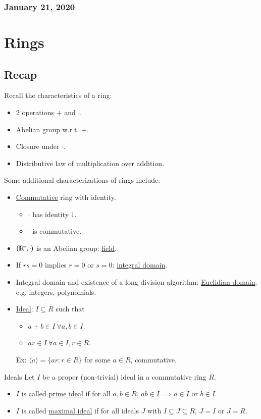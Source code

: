 \subsubsection*{January 21, 2020}
\section{Rings}
\subsection{Recap}
Recall the characteristics of a ring: 
\begin{itemize}
	\item 2 operations $+$ and $\cdot$. 
	\item Abelian group w.r.t. $+$. 
	\item Closure under $\cdot$. 
	\item Distributive law of multiplication over addition. 
\end{itemize}
Some additional characterizations of rings include: 
\begin{itemize}
	\item \ul{Commutative} ring with identity. 
	\begin{itemize}
		\item $\cdot$ has identity $1$. 
		\item $\cdot$ is commutative. 
	\end{itemize}
	\item $(\mathbb{R}^*, \cdot)$ is an Abelian group: \ul{field}. 
	\item If $rs=0$ implies $r=0$ or $s=0$: \ul{integral domain}. 
	\item Integral domain and existence of a long division algorithm: \ul{Euclidian domain}. e.g. integers, polynomials. 
	\item \ul{Ideal}: $I\subseteq R$ such that
	\begin{itemize}
		\item $a+b\in I\ \forall a,b\in I$. 
		\item $ar\in I\ \forall a\in I, r\in R$. 
	\end{itemize}
	
	Ex: $\langle a\rangle=\{ar:r\in R\}$ for some $a\in R$, commutative. 
\end{itemize}

\begin{defn}{Ideals}
	Let $I$ be a proper (non-trivial) ideal in a commutative ring $R$. 
	\begin{itemize}
		\item $I$ is called \ul{prime ideal} if for all $a,b\in R$, $ab\in I\implies a\in I$ or $b\in I$. 
		\item $I$ is called \ul{maximal ideal} if for all ideals $J$ with $I\subseteq J\subseteq R$, $J = I$ or $J = R$. 
	\end{itemize}
\end{defn}


